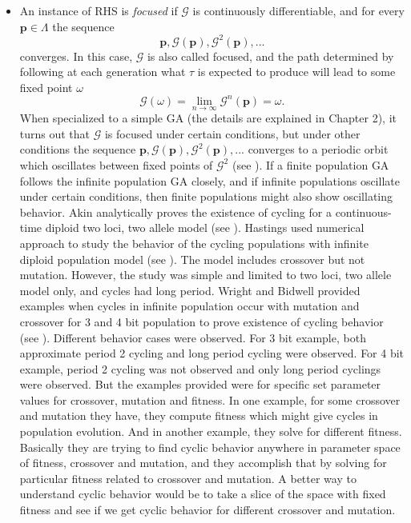 \begin{itemize}
\item{
An instance of RHS is {\em focused\/} if $\mathcal{G}$ is continuously differentiable, and for every $\bm{p}  \in  \Lambda$
the sequence
\[
\bm{p},  \mathcal{G}(\bm{p}),  {\mathcal{G}}^2(\bm{p}),...
\]
converges. In this case, $\mathcal{G}$ is also called focused, and the path determined by following at each generation what $\tau$ is expected 
to produce will lead to some fixed point $\omega$
\[
\mathcal{G}(\omega) = \lim_{n\to\infty} \mathcal{G}^n(\bm{p}) = \omega.
\]
When specialized to a simple GA (the details are explained in Chapter 2), it turns out that $ \mathcal{G}$ is focused under certain conditions, 
but under other conditions the sequence 
$\bm{p},  \mathcal{G}(\bm{p}),  {\mathcal{G}}^2(\bm{p}),...$ converges 
to a periodic orbit which oscillates between fixed points of $\mathcal{G}^2$ (see \cite{Vose1999}). 
If a finite population GA follows the infinite population GA closely, and if infinite populations oscillate under certain conditions, then 
finite populations might also show oscillating behavior. 
Akin analytically proves the existence of cycling for a continuous-time diploid two loci, two allele model (see \cite{Akin1982}). 
Hastings used numerical approach to study 
the behavior of the cycling populations with infinite diploid population model (see \cite{Hastings1981}). 
The model includes crossover but not mutation. 
However, the study was simple and limited to two loci, two allele model only, and cycles had long period. 
Wright and Bidwell provided examples when cycles in infinite population occur with mutation and 
crossover for 3 and 4 bit population to prove existence of cycling behavior (see \cite{Wright1997}). 
Different behavior cases were observed. 
For 3 bit example, both approximate period 2 cycling and long period cycling were observed. 
For 4 bit example, period 2 cycling was not observed and only long period cyclings were observed. 
But the examples provided were for specific 
set parameter values for crossover, mutation and fitness. In one example, for some crossover and mutation they have, they 
compute fitness which might give cycles in population evolution. And in another example, they solve for different fitness. 
Basically they are trying to find cyclic behavior anywhere in parameter space of fitness, crossover and mutation, and they accomplish 
that by solving for particular fitness related to crossover and mutation. A better way to understand cyclic behavior would be 
to take a slice of the space with fixed fitness and see if we get cyclic behavior for different crossover and mutation. 

}
\end{itemize}
